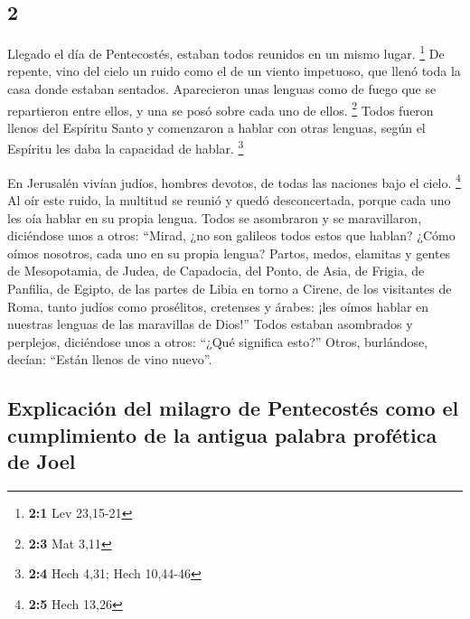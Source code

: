 \begin{paracol}{2}
\hypertarget{section-2}{%
\section{2}\label{section-2}}

 Llegado el día de Pentecostés, estaban todos reunidos en
un mismo lugar. \footnote{\textbf{2:1} Lev 23,15-21}  De
repente, vino del cielo un ruido como el de un viento impetuoso, que
llenó toda la casa donde estaban sentados.  Aparecieron
unas lenguas como de fuego que se repartieron entre ellos, y una se posó
sobre cada uno de ellos. \footnote{\textbf{2:3} Mat 3,11} 
Todos fueron llenos del Espíritu Santo y comenzaron a hablar con otras
lenguas, según el Espíritu les daba la capacidad de hablar. \footnote{\textbf{2:4}
  Hech 4,31; Hech 10,44-46}

 En Jerusalén vivían judíos, hombres devotos, de todas las
naciones bajo el cielo. \footnote{\textbf{2:5} Hech 13,26}
 Al oír este ruido, la multitud se reunió y quedó
desconcertada, porque cada uno les oía hablar en su propia lengua.
 Todos se asombraron y se maravillaron, diciéndose unos a
otros: ``Mirad, ¿no son galileos todos estos que hablan? 
¿Cómo oímos nosotros, cada uno en su propia lengua? 
Partos, medos, elamitas y gentes de Mesopotamia, de Judea, de Capadocia,
del Ponto, de Asia,  de Frigia, de Panfilia, de Egipto,
de las partes de Libia en torno a Cirene, de los visitantes de Roma,
tanto judíos como prosélitos,  cretenses y árabes: ¡les
oímos hablar en nuestras lenguas de las maravillas de Dios!''
 Todos estaban asombrados y perplejos, diciéndose unos a
otros: ``¿Qué significa esto?''  Otros, burlándose,
decían: ``Están llenos de vino nuevo''.

\hypertarget{explicaciuxf3n-del-milagro-de-pentecostuxe9s-como-el-cumplimiento-de-la-antigua-palabra-profuxe9tica-de-joel}{%
\subsection{Explicación del milagro de Pentecostés como el cumplimiento
de la antigua palabra profética de
Joel}\label{explicaciuxf3n-del-milagro-de-pentecostuxe9s-como-el-cumplimiento-de-la-antigua-palabra-profuxe9tica-de-joel}}


\end{paracol}
